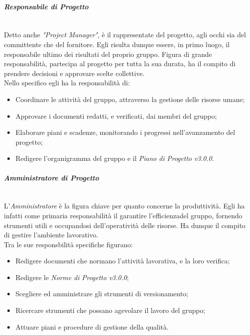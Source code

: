 \paragraph{\textit{Responsabile di Progetto}} ~\\
	Detto anche \textit{"Project Manager"}, è il rappresentate del progetto\glossario, agli occhi sia del committente che del 			fornitore. Egli risulta dunque essere, in primo luogo, il responsabile ultimo dei risultati del proprio gruppo. 			Figura di grande responsabilità, partecipa al progetto per tutta la sua durata, ha il compito di prendere 						decisioni 	e approvare scelte collettive.\\
	Nello specifico egli ha la responsabilità di:
	\begin{itemize}
	\item Coordinare le attività del gruppo, attraverso la gestione delle risorse umane;
	\item Approvare i documenti redatti, e verificati, dai membri del gruppo;
	\item Elaborare piani e scadenze, monitorando i progressi nell'avanzamento del progetto;
	\item Redigere l'organigramma del gruppo e il \textit{Piano di Progetto v3.0.0}.
	\end{itemize}

\paragraph{\textit{Amministratore di Progetto}} ~\\
	L'\textit{Amministratore} è la figura chiave per quanto concerne la produttività. Egli ha infatti come primaria 							responsabilità il garantire l'efficienza\glossario del gruppo, fornendo strumenti utili e occupandosi 								dell'operatività delle risorse. Ha dunque il compito di gestire l'ambiente lavorativo.\\
	Tra le sue responsbilità specifiche figurano:
	\begin{itemize}
	\item Redigere documenti che normano l'attività lavorativa, e la loro verifica;
	\item Redigere le \textit{Norme di Progetto v3.0.0};
	\item Scegliere ed amministrare gli strumenti di versionamento\glossario;
	\item Ricercare strumenti che possano agevolare il lavoro del gruppo;
	\item Attuare piani e procedure di gestione della qualità\glossario.
	\end{itemize}


